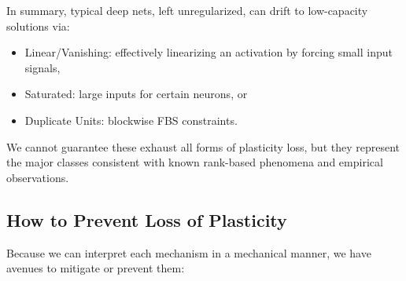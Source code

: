 \documentclass[11pt]{article}
\begin{document}
In summary, typical deep nets, left unregularized, can drift to low-capacity solutions via:
\begin{itemize}
    \item Linear/Vanishing: effectively linearizing an activation by forcing small input signals,
    \item Saturated: large inputs for certain neurons, or
    \item Duplicate Units: blockwise FBS constraints.
\end{itemize}
We cannot guarantee these exhaust all forms of plasticity loss, but they represent the major classes consistent with known rank-based phenomena and empirical observations.

\subsection{How to Prevent Loss of Plasticity}
Because we can interpret each mechanism in a mechanical manner, we have avenues to mitigate or prevent them:
\end{document}
